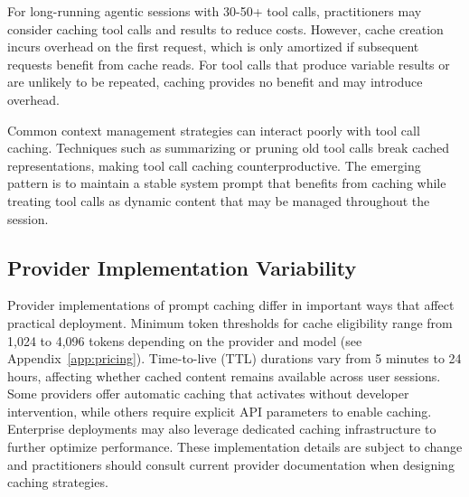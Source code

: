 \documentclass{article}
\theoremstyle{plain}
\theoremstyle{definition}
\theoremstyle{remark}
\begin{document}


For long-running agentic sessions with 30-50+ tool calls, practitioners may consider caching tool calls and results to reduce costs. However, cache creation incurs overhead on the first request, which is only amortized if subsequent requests benefit from cache reads. For tool calls that produce variable results or are unlikely to be repeated, caching provides no benefit and may introduce overhead. 

Common context management strategies can interact poorly with tool call caching. Techniques such as summarizing or pruning old tool calls \citep{ji2025manus_context_engineering} break cached representations, making tool call caching counterproductive. The emerging pattern is to maintain a stable system prompt that benefits from caching while treating tool calls as dynamic content that may be managed throughout the session.

\subsection{Provider Implementation Variability}
\label{subsec:provider_variability}

Provider implementations of prompt caching differ in important ways that affect practical deployment. Minimum token thresholds for cache eligibility range from 1,024 to 4,096 tokens depending on the provider and model (see Appendix~\ref{app:pricing}). Time-to-live (TTL) durations vary from 5 minutes to 24 hours, affecting whether cached content remains available across user sessions. Some providers offer automatic caching that activates without developer intervention, while others require explicit API parameters to enable caching. Enterprise deployments may also leverage dedicated caching infrastructure \citep{liu2024cachegen,cheng2024large,10.1145/3689031.3696098,cheng2025lmcache} to further optimize performance. These implementation details are subject to change and practitioners should consult current provider documentation when designing caching strategies.
\end{document}
